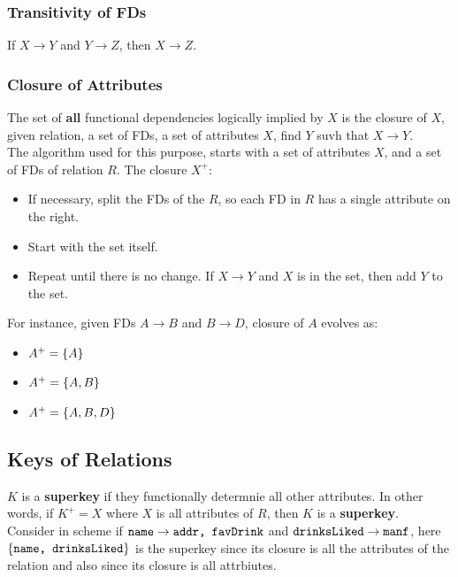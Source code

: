 \documentclass[11pt,a4paper,twocolumn]{book}
\begin{document}
\subsubsection{Transitivity of FDs}

If $X \to Y$ and $Y \to Z$, then $X \to Z$.

\subsubsection{Closure of Attributes}

The set of \textbf{all} functional dependencies logically implied by $X$ is the closure of $X$, given relation, a set of FDs, a set of attributes $X$, find $Y$ suvh that $X \to Y$.\\

The algorithm used for this purpose, starts with a set of attributes $X$, and a set of FDs of relation $R$. The closure $X^+$:

\begin{itemize}
\item If necessary, split the FDs of the $R$, so each FD in $R$ has a single attribute on the right.
\item Start with the set itself.
\item Repeat until there is no change. If $X \to Y$ and $X$ is in the set, then add $Y$ to the set.
\end{itemize}

For instance, given FDs $A \to B$ and $B \to D$, closure of $A$ evolves as:

\begin{itemize}
\item $A^+ = \{ A \}$
\item $A^+ = \{ A, B \}$
\item $A^+ = \{ A, B, D \}$
\end{itemize}

\subsection{Keys of Relations}

$K$ is a \textbf{superkey} if they functionally determnie all other attributes. In other words, if $K^+ = X$ where $X$ is all attributes of $R$, then $K$ is a \textbf{superkey}.\\

Consider in scheme  if $\texttt{name} \to \texttt{addr, favDrink}$ and $\texttt{drinksLiked} \to \texttt{manf}$, here $\{ \texttt{name, drinksLiked} \}$ is the superkey since its closure is all the attributes of the relation and also since its closure is all attrbiutes.\\
\end{document}
